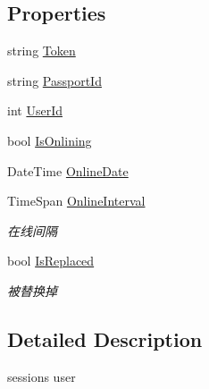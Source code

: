 \subsection*{Properties}
\begin{DoxyCompactItemize}
\item 
string \mbox{\hyperlink{class_t_net_1_1_context___1_1_session_user_a7a21e163586108bcc26142e1cdf1047e}{Token}}
\item 
string \mbox{\hyperlink{class_t_net_1_1_context___1_1_session_user_a7d33b5fbe33ed5d44ee0b480dd124aca}{Passport\+Id}}
\item 
int \mbox{\hyperlink{class_t_net_1_1_context___1_1_session_user_a04ab0e41d46af9a3b656d8d8dd46f063}{User\+Id}}
\item 
bool \mbox{\hyperlink{class_t_net_1_1_context___1_1_session_user_a1ddc5bd0a078edffd4fcdc87e907dae4}{Is\+Onlining}}
\item 
Date\+Time \mbox{\hyperlink{class_t_net_1_1_context___1_1_session_user_a077acd9c68432fb4f4ce983fe5e2e84e}{Online\+Date}}
\item 
Time\+Span \mbox{\hyperlink{class_t_net_1_1_context___1_1_session_user_acae6c8ec4ac3e3e38e15ad55d6bddbf7}{Online\+Interval}}
\begin{DoxyCompactList}\small\item\em 在线间隔 \end{DoxyCompactList}\item 
bool \mbox{\hyperlink{class_t_net_1_1_context___1_1_session_user_a9b025895072ce3bcc990e9a3cd4e0bcc}{Is\+Replaced}}
\begin{DoxyCompactList}\small\item\em 被替换掉 \end{DoxyCompactList}\end{DoxyCompactItemize}


\subsection{Detailed Description}
session\textquotesingle{}s user 



